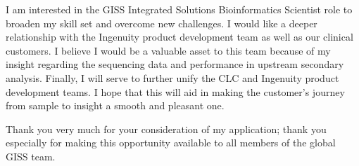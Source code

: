 \documentclass[10pt,letterpaper,sigleft]{newlfm}
\begin{document}
\begin{newlfm}
I am interested in the GISS Integrated Solutions Bioinformatics Scientist role to broaden my skill set and overcome new challenges. I would like a deeper relationship with the Ingenuity product development team as well as our clinical customers. I believe I would be a valuable asset to this team because of my insight regarding the sequencing data and performance in upstream secondary analysis. Finally, I will serve to further unify the CLC and Ingenuity product development teams. I hope that this will aid in making the customer's journey from sample to insight a smooth and pleasant one.

Thank you very much for your consideration of my application; thank you especially for making this opportunity available to all members of the global GISS team.



 

\end{newlfm}
\end{document}
